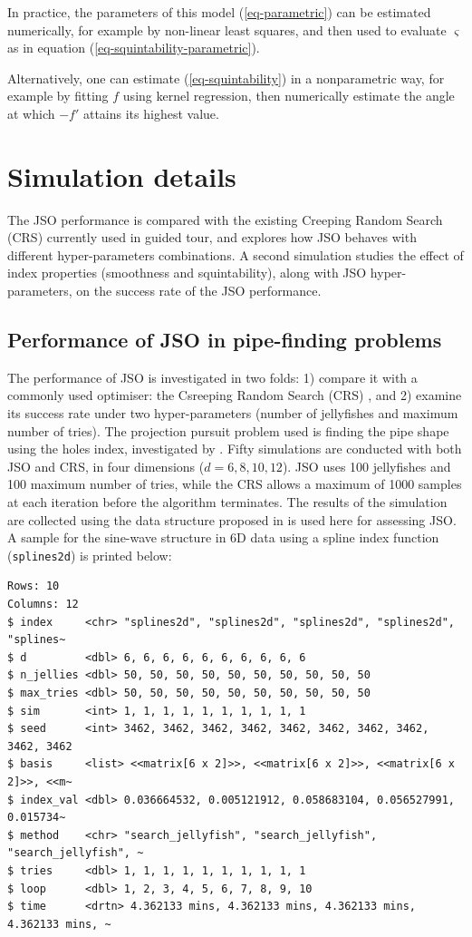 \documentclass[
  number,
  preprint,
  3p]{elsarticle}
\begin{document}
In practice, the parameters of this model (\ref{eq-parametric}) can be
estimated numerically, for example by non-linear least squares, and then
used to evaluate \(\varsigma\) as in equation
(\ref{eq-squintability-parametric}).

Alternatively, one can estimate (\ref{eq-squintability}) in a
nonparametric way, for example by fitting \(f\) using kernel regression,
then numerically estimate the angle at which \(-f'\) attains its highest
value.

\section{Simulation details}\label{sec-sim-deets}

The JSO performance is compared with the existing Creeping Random Search
(CRS) currently used in guided tour, and explores how JSO behaves with
different hyper-parameters combinations. A second simulation studies the
effect of index properties (smoothness and squintability), along with
JSO hyper-parameters, on the success rate of the JSO performance.

\subsection{Performance of JSO in pipe-finding
problems}\label{sec-app-1}

The performance of JSO is investigated in two folds: 1) compare it with
a commonly used optimiser: the Csreeping Random Search (CRS)
\citep{RJ-2021-105, laa_using_2020}, and 2) examine its success rate
under two hyper-parameters (number of jellyfishes and maximum number of
tries). The projection pursuit problem used is finding the pipe shape
using the holes index, investigated by \citet{laa_using_2020}. Fifty
simulations are conducted with both JSO and CRS, in four dimensions
(\(d = 6, 8, 10, 12\)). JSO uses 100 jellyfishes and 100 maximum number
of tries, while the CRS allows a maximum of 1000 samples at each
iteration before the algorithm terminates. The results of the simulation
are collected using the data structure proposed in \citet{RJ-2021-105}
is used here for assessing JSO. A sample for the sine-wave structure in
6D data using a spline index function (\texttt{splines2d}) is printed
below:

\begin{verbatim}
Rows: 10
Columns: 12
$ index     <chr> "splines2d", "splines2d", "splines2d", "splines2d", "splines~
$ d         <dbl> 6, 6, 6, 6, 6, 6, 6, 6, 6, 6
$ n_jellies <dbl> 50, 50, 50, 50, 50, 50, 50, 50, 50, 50
$ max_tries <dbl> 50, 50, 50, 50, 50, 50, 50, 50, 50, 50
$ sim       <int> 1, 1, 1, 1, 1, 1, 1, 1, 1, 1
$ seed      <int> 3462, 3462, 3462, 3462, 3462, 3462, 3462, 3462, 3462, 3462
$ basis     <list> <<matrix[6 x 2]>>, <<matrix[6 x 2]>>, <<matrix[6 x 2]>>, <<m~
$ index_val <dbl> 0.036664532, 0.005121912, 0.058683104, 0.056527991, 0.015734~
$ method    <chr> "search_jellyfish", "search_jellyfish", "search_jellyfish", ~
$ tries     <dbl> 1, 1, 1, 1, 1, 1, 1, 1, 1, 1
$ loop      <dbl> 1, 2, 3, 4, 5, 6, 7, 8, 9, 10
$ time      <drtn> 4.362133 mins, 4.362133 mins, 4.362133 mins, 4.362133 mins, ~
\end{verbatim}
\end{document}
